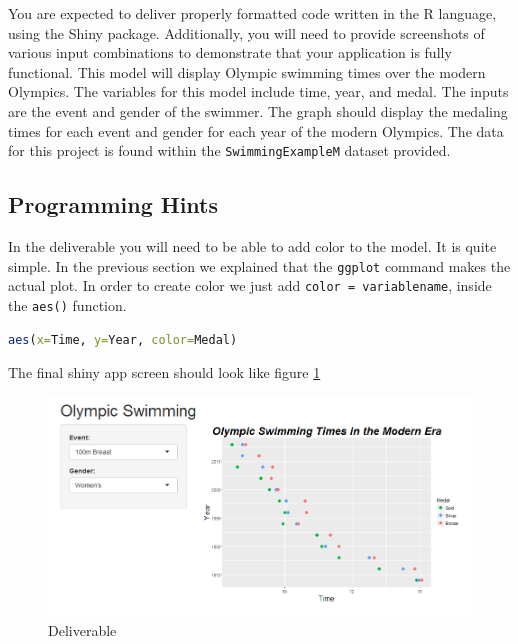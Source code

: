 You are expected to deliver properly formatted code written in the R language, using the Shiny package.
Additionally, you will need to provide screenshots of various input combinations to demonstrate that your application is fully functional.
This model will display Olympic swimming times over the modern Olympics.
The variables for this model include time, year, and medal.
The inputs are the event and gender of the swimmer.
The graph should display the medaling times for each event and gender for each year of the modern Olympics.
The data for this project is found within the \texttt{SwimmingExampleM} dataset provided. 
\subsection{Programming Hints}
In the deliverable you will need to be able to add color to the model.
It is quite simple.
In the previous section we explained that the \texttt{ggplot} command makes the actual plot.
In order to create color we just add \texttt{color = variablename}, inside the \texttt{aes()} function.

\begin{lstlisting}[language = R]
aes(x=Time, y=Year, color=Medal)
\end{lstlisting}
The final shiny app screen should look like figure \ref{fig:olympic}
\begin{figure}[htbp!]
   \centering
   \includegraphics[width = .5\textwidth]{pictures/shiny/olympic.PNG} 
   \caption{Deliverable}
   \label{fig:olympic}
\end{figure}

